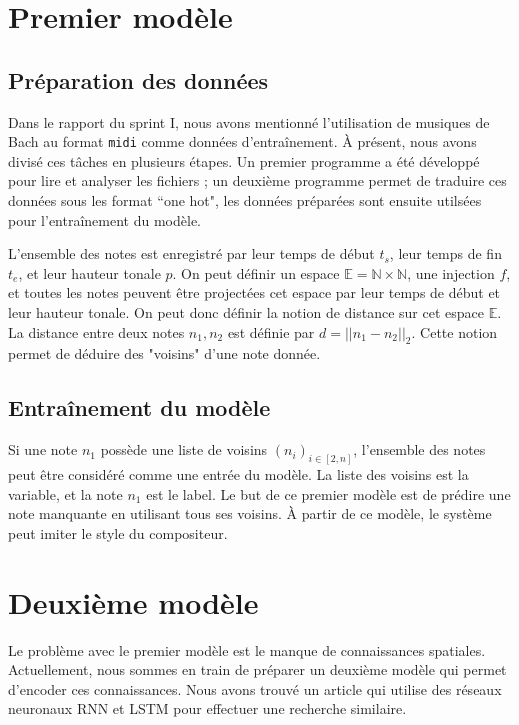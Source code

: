 \documentclass{article}
\begin{document}
\section{Premier modèle}

\subsection{Préparation des données}

\par Dans le rapport du sprint I, nous avons mentionné l'utilisation de musiques de Bach au format \texttt{midi} comme données d'entraînement. À présent, nous avons divisé ces tâches en plusieurs étapes. Un premier programme a été développé pour lire et analyser les fichiers ; un deuxième programme permet de traduire ces données sous les format ``one hot", les données préparées sont ensuite utilsées pour l'entraînement du modèle.

\par L'ensemble des notes est enregistré par leur temps de début $t_s$, leur temps de fin $t_e$, et leur hauteur tonale $p$. On peut définir un espace $\mathbb{E} = \mathbb{N} \times \mathbb{N}$, une injection $f$, et toutes les notes peuvent être projectées cet espace par leur temps de début et leur hauteur tonale. On peut donc définir la notion de distance sur cet espace $\mathbb{E}$. La distance entre deux notes $n_1, n_2$ est définie par $d = ||n_1 - n_2||_2$. Cette notion permet de déduire des "voisins" d'une note donnée.

\subsection{Entraînement du modèle}

\par Si une note $n_1$ possède une liste de voisins $(n_i)_{i \in [2, n]}$, l'ensemble des notes peut être considéré comme une entrée du modèle. La liste des voisins est la variable, et la note $n_1$ est le label. Le but de ce premier modèle est de prédire une note manquante en utilisant tous ses voisins. À partir de ce modèle, le système peut imiter le style du compositeur.

\section{Deuxième modèle}

\par Le problème avec le premier modèle est le manque de connaissances spatiales. Actuellement, nous sommes en train de préparer un deuxième modèle qui permet d'encoder ces connaissances. Nous avons trouvé un article qui utilise des réseaux neuronaux RNN et LSTM pour effectuer une recherche similaire\cite{music-gen-RNN-LSTM}.
\end{document}

